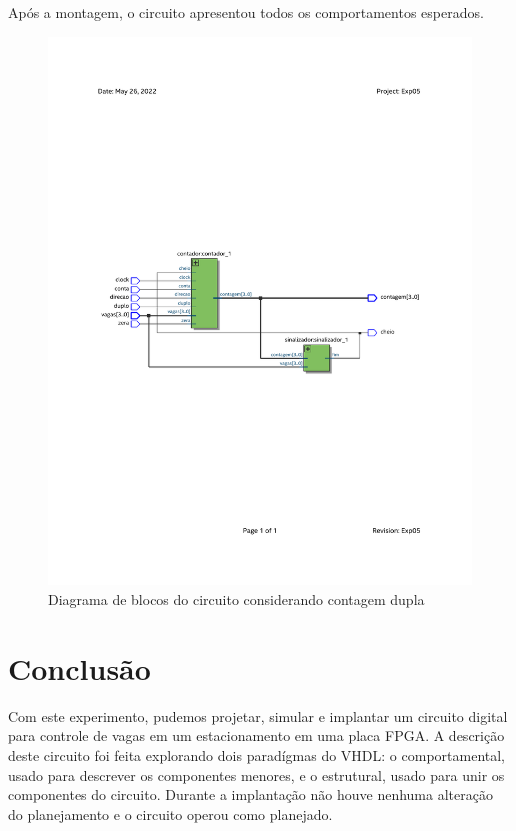 \documentclass[a4,12pt]{horizon-theme}
\begin{document}
Após a montagem, o circuito apresentou todos os comportamentos esperados.

\begin{figure}[!ht]
  \centering
  \includegraphics[width=\textwidth, trim={25mm, 100mm, 25mm, 108mm}, clip]{desafio.pdf}
  \caption{Diagrama de blocos do circuito considerando contagem dupla}
  \label{fig:desafio}
\end{figure}



\section{Conclusão}
Com este experimento, pudemos projetar, simular e implantar um circuito digital para controle de vagas em um estacionamento em uma placa FPGA. A descrição deste circuito foi feita explorando dois paradígmas do VHDL: o comportamental, usado para descrever os componentes menores, e o estrutural, usado para unir os componentes do circuito. Durante a implantação não houve nenhuma alteração do planejamento e o circuito operou como planejado.
\end{document}
